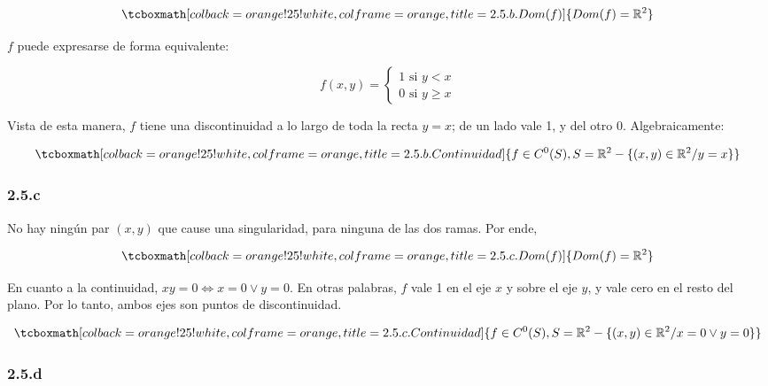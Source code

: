 \documentclass{article}
\renewcommand{\Bbb}{\mathbb}
\begin{document}
\begin{equation}
\tcboxmath[colback=orange!25!white,colframe=orange,title=2.5.b. Dom(f) ]
{ \mathop{Dom}(f) = \Bbb R^2 }
\end{equation}

$f$ puede expresarse de forma equivalente:

\begin{equation}
f(x,y) = \left\{ \begin{array}{ll}
1 \text{ si } y < x \\
0 \text{ si } y \geq x
\end{array} \right.
\end{equation}

Vista de esta manera, $f$ tiene una discontinuidad a lo largo de toda la recta $y = x$; de un lado vale 1, y del otro 0. Algebraicamente:

\begin{equation}
\tcboxmath[colback=orange!25!white,colframe=orange,title=2.5.b. Continuidad ]
{ f \in C^0(S), S = \Bbb R^2 - \{ (x,y) \in \Bbb R^2 / y = x \} }
\end{equation}

\subsubsection*{2.5.c}
\label{subsubsec:2.5.c}

No hay ningún par $(x,y)$ que cause una singularidad, para ninguna de las dos ramas. Por ende,

\begin{equation}
\tcboxmath[colback=orange!25!white,colframe=orange,title=2.5.c. Dom(f) ]
{ \mathop{Dom}(f) = \Bbb R^2 }
\end{equation}

En cuanto a la continuidad, $xy = 0 \Leftrightarrow x = 0 \vee y = 0$. En otras palabras, $f$ vale 1 en el eje $x$ y sobre el eje $y$, y vale cero en el resto del plano. Por lo tanto, ambos ejes son puntos de discontinuidad.

\begin{equation}
\tcboxmath[colback=orange!25!white,colframe=orange,title=2.5.c. Continuidad ]
{ f \in C^0(S), S = \Bbb R^2 - \{ (x,y) \in \Bbb R^2 / x = 0 \vee y = 0 \} }
\end{equation}

\subsubsection*{2.5.d}
\label{subsubsec:2.5.d}
\end{document}

